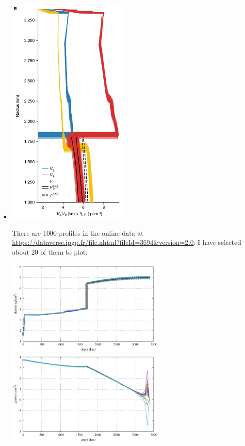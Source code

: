 \begin{itemize}
\item {}

\begin{center}
\includegraphics[width=6cm]{images/mars/density/khhd23.png}
\end{center}

There are 1000 profiles in the online data at 
\url{https://dataverse.ipgp.fr/file.xhtml?fileId=3694&version=2.0}.
I have selected about 20 of them to plot:

\begin{center}
\includegraphics[width=8cm]{images/mars/density/khhd23/rho.pdf}
\includegraphics[width=8cm]{images/mars/density/khhd23/g.pdf}
\end{center}


\end{itemize}
